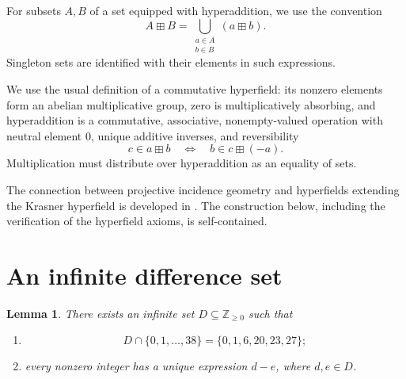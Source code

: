 \documentclass[11pt]{article}
\newcommand{\ZZ}{\mathbb{Z}}
\newtheorem{lemma}[theorem]{Lemma}
\begin{document}
For subsets \(A,B\) of a set equipped with hyperaddition, we use the convention
\[
    A\boxplus B
    =\bigcup_{\substack{a\in A\\ b\in B}}(a\boxplus b).
\]
Singleton sets are identified with their elements in such expressions.

We use the usual definition of a commutative hyperfield: its nonzero elements
form an abelian multiplicative group, zero is multiplicatively absorbing,
and hyperaddition is a commutative, associative, nonempty-valued operation
with neutral element \(0\), unique additive inverses, and reversibility
\[
    c\in a\boxplus b
    \quad\Longleftrightarrow\quad
    b\in c\boxplus(-a).
\]
Multiplication must distribute over hyperaddition as an equality of sets.

The connection between projective incidence geometry and hyperfields
extending the Krasner hyperfield is developed in
\cite[Sections~3--4]{CC}. The construction below, including the verification
of the hyperfield axioms, is self-contained.

\section{An infinite difference set}
\begin{lemma}\label{lem:difference-set}
There exists an infinite set \(D\subseteq\ZZ_{\geq 0}\) such that
\begin{enumerate}
    \item
    \[
        D\cap\{0,1,\ldots,38\}=\{0,1,6,20,23,27\};
    \]
    \item every nonzero integer has a unique expression \(d-e\), where
    \(d,e\in D\).
\end{enumerate}
\end{lemma}
\end{document}
